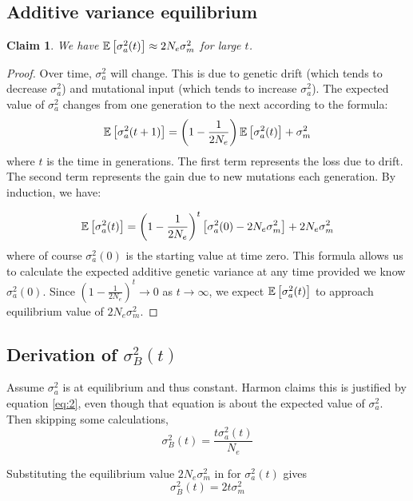 \documentclass{article}
\newtheorem{claim}{Claim} \newtheorem{problem}{Problem}
\def\[{\left [} \def\]{\right ]} \def\({\left (} \def\){\right )}
\newcommand{\advar}{\sigma_{a}^{2}} %
\newcommand{\bvar}{\sigma_{B}^{2}}  %
\newcommand{\mvar}{\sigma_{m}^{2}}  %
\begin{document}
\subsection{Additive variance equilibrium}
\begin{claim}
  We have $\E\[ \advar (t)\] \approx 2N_{e}\sigma_{m}^{2}$ for large $t$.
\end{claim}
\begin{proof}
  Over time, $\advar$ will change. This is due to genetic drift (which tends to
  decrease $\advar$) and mutational input (which tends to increase $\advar$). The
  expected value of $\advar$ changes from one generation to the next according to
  the formula:
  \begin{equation*} \E\[\advar(t+1) \]= \left( 1-\frac{1}{2N_{e}}
    \right)\E\[\sigma_{a}^{2}(t) \]+\sigma_{m}^{2}
  \end{equation*}
  where $t$ is the time in generations. The first term represents the loss due to
  drift. The second term represents the gain due to new mutations each generation.
  By induction, we have:

  \begin{equation}\label{eq:2}
    \E\[\advar(t) \] = \left( 1-\frac{1}{2N_{e}} \right)^{t}\left[ \advar(0) -2N_{e}\mvar \right] + 2N_{e}\mvar 
  \end{equation}
  where of course $\advar(0)$ is the starting value at time zero. This formula
  allows us to calculate the expected additive genetic variance at any time
  provided we know $\advar(0)$. Since $\left( 1-\frac{1}{2N_{e}} \right)^{t}\to 0$
  as $t\to\infty$, we expect $\E\[ \advar (t) \]$ to approach equilibrium value of
  $2N_{e}\sigma_{m}^{2}$.
\end{proof}


\subsection{Derivation of $\bvar(t)$}
  

Assume $\advar$ is at equilibrium and thus constant. Harmon claims this is
justified by equation \eqref{eq:2}, even though that equation is about the
expected value of $\advar$. Then skipping some calculations,
\begin{equation}
  \label{eq:1}
  \bvar(t)= \frac{t\advar(t)}{N_{e}}
\end{equation}

Substituting the equilibrium value $2N_{e}\mvar$ in for $\advar(t)$ gives
\begin{equation}
  \label{eq:4}
  \bvar(t) = 2t \mvar
\end{equation}
\end{document}
